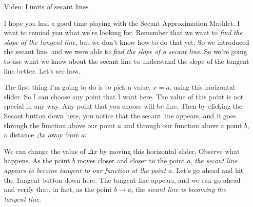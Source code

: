 \documentclass[pdftex, brazil, 12pt, twoside]{article}
\begin{document}
Video: \href{https://www.youtube.com/watch?v=alYYhzUak1o}{Limits of secant lines}

I hope you had a good time playing
with the Secant Approximation Mathlet.
I want to remind you what we're looking for.
Remember that we want to \emph{find the slope of the tangent line},
but we don't know how to do that yet.
So we introduced the secant line,
and we were able to \emph{find the slope of a secant line}.
So we're going to use what we know about the secant line
to understand the slope of the tangent line better.
Let's see how.

The first thing I'm going to do is to pick a value,
$x = a$, using this horizontal slider.
So I can choose any point that I want here.
The value of this point is not special in any way.
Any point that you choose will be fine.
Then by clicking the Secant button down here,
you notice that the secant line appears,
and it goes through the function above our point $a$
and through our function above a point
$b$, a distance $\Delta x$ away from $a$:

\begin{figure}[H]
  \begin{center}
  \end{center}
\end{figure}

We can change the value of $\Delta x$
by moving this horizontal slider.
Observe what happens.
As the point $b$ moves closer and closer to the point $a$,
\emph{the secant line appears to become tangent
to our function at the point $a$}.
Let's go ahead and hit the Tangent button down here.
The tangent line appears, and we can go ahead and verify
that, in fact, as the point $b \to a$, the \emph{secant line is becoming
the tangent line}.
\end{document}

